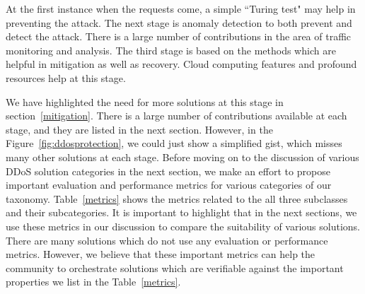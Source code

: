 \documentclass[final,5p,times,twocolumn]{elsarticle}
\begin{document}
\noindent At the first instance when the requests come, a simple ``Turing test" may help in preventing the attack. The next stage is anomaly detection to both prevent and detect the attack. There is a large number of contributions in the area of traffic monitoring and analysis. The third stage is based on the methods which are helpful in mitigation as well as recovery. Cloud computing features and profound resources help at this stage. \par We have highlighted the need for more solutions at this stage in section~\ref{mitigation}. There is a large number of contributions available at each stage, and they are listed in the next section. However, in the Figure~\ref{fig:ddosprotection}, we could just show a simplified gist, which misses many other solutions at each stage.  
{Before moving on to the discussion of various DDoS solution categories in the next section, we make an effort to propose important evaluation and performance metrics for various categories of our taxonomy. Table~\ref{metrics} shows the metrics related to the all three subclasses and their subcategories. It is important to highlight that in the next sections, we use these metrics in our discussion to compare the suitability of various solutions. There are many solutions which do not use any evaluation or performance metrics. However, we believe that these important metrics can help the community to orchestrate solutions which are verifiable against the important properties we list in the Table~\ref{metrics}. }
\end{document}

